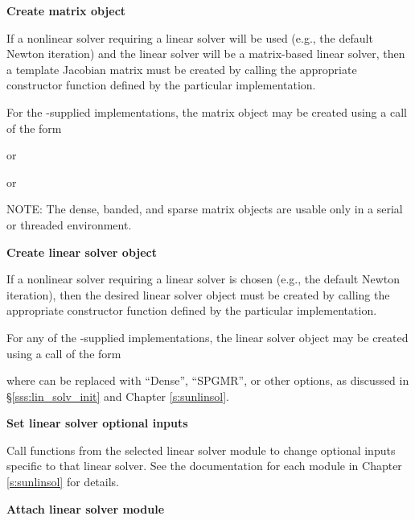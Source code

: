 \begin{Steps}
\item\label{i:matrix}
  {\bf Create matrix object}

  If a nonlinear solver requiring a linear solver will be used (e.g., the
  default Newton iteration) and the linear solver will be a matrix-based linear
  solver, then a template Jacobian matrix must be created by calling the
  appropriate constructor function defined by the particular {\sunmatrix}
  implementation.

  For the {\sundials}-supplied {\sunmatrix} implementations, the
  matrix object may be created using a call of the form


   or


   or


  NOTE: The dense, banded, and sparse matrix objects are usable only in a
  serial or threaded environment.

\item\label{i:lin_solver}
  {\bf Create linear solver object}

  If a nonlinear solver requiring a linear solver is chosen (e.g., the default
  Newton iteration), then the desired linear solver object must be created by
  calling the appropriate constructor function defined by the particular
  {\sunlinsol} implementation.

  For any of the {\sundials}-supplied {\sunlinsol} implementations,
  the linear solver object may be created using a call of the form


  where \id{*} can be replaced with ``Dense'', ``SPGMR'', or other
  options, as discussed in \S\ref{sss:lin_solv_init} and Chapter {\ref{s:sunlinsol}}.

\item
  {\bf Set linear solver optional inputs}

  Call  functions from the selected linear solver module
  to change optional inputs specific to that linear solver.
  See the documentation for each {\sunlinsol} module in Chapter
  {\ref{s:sunlinsol}} for details.

\item\label{i:lin_solver_interface}
  {\bf Attach linear solver module}


\end{Steps}
